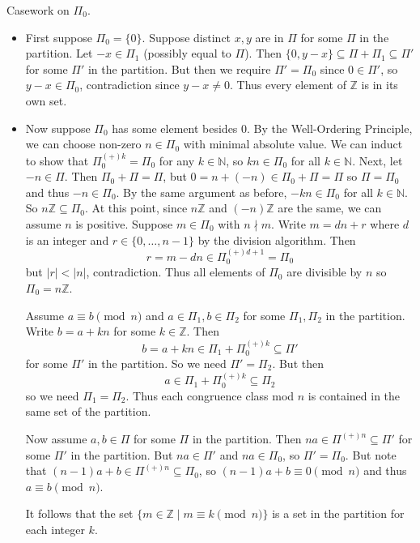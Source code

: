 Casework on $\Pi_0$.
\begin{itemize}
	\item First suppose $\Pi_0=\{0\}$. Suppose distinct $x,y$ are in $\Pi$ for some $\Pi$ in the partition. Let $-x\in\Pi_1$ (possibly equal to $\Pi$). Then $\{0,y-x\}\subseteq\Pi+\Pi_1\subseteq\Pi'$ for some $\Pi'$ in the partition. But then we require $\Pi'=\Pi_0$ since $0\in\Pi'$, so $y-x\in\Pi_0$, contradiction since $y-x\neq0$. Thus every element of $\mathbb{Z}$ is in its own set.
	\item Now suppose $\Pi_0$ has some element besides $0$. By the Well-Ordering Principle, we can choose non-zero $n\in\Pi_0$ with minimal absolute value. We can induct to show that $\Pi_0^{(+)k}=\Pi_0$ for any $k\in\mathbb{N}$, so $kn\in\Pi_0$ for all $k\in\mathbb{N}$. Next, let $-n\in\Pi$. Then $\Pi_0+\Pi=\Pi$, but $0=n+(-n)\in\Pi_0+\Pi=\Pi$ so $\Pi=\Pi_0$ and thus $-n\in\Pi_0$. By the same argument as before, $-kn\in\Pi_0$ for all $k\in\mathbb{N}$. So $n\mathbb{Z}\subseteq\Pi_0$. At this point, since $n\mathbb{Z}$ and $(-n)\mathbb{Z}$ are the same, we can assume $n$ is positive. Suppose $m\in\Pi_0$ with $n\nmid m$. Write $m=dn+r$ where $d$ is an integer and $r\in\{0,\ldots,n-1\}$ by the division algorithm. Then
	\[
		r=m-dn\in\Pi_0^{(+)d+1}=\Pi_0
	\]
	but $|r|<|n|$, contradiction. Thus all elements of $\Pi_0$ are divisible by $n$ so $\Pi_0=n\mathbb{Z}$.
	
	Assume $a\equiv b\pmod n$ and $a\in\Pi_1,b\in\Pi_2$ for some $\Pi_1,\Pi_2$ in the partition. Write $b=a+kn$ for some $k\in\mathbb{Z}$. Then
	\[
		b=a+kn\in\Pi_1+\Pi_0^{(+)k}\subseteq\Pi'
	\]
	for some $\Pi'$ in the partition. So we need $\Pi'=\Pi_2$. But then
	\[
		a\in\Pi_1+\Pi_0^{(+)k}\subseteq\Pi_2
	\]
	so we need $\Pi_1=\Pi_2$. Thus each congruence class mod $n$ is contained in the same set of the partition.
	
	Now assume $a,b\in\Pi$ for some $\Pi$ in the partition. Then $na\in\Pi^{(+)n}\subseteq\Pi'$ for some $\Pi'$ in the partition. But $na\in\Pi'$ and $na\in\Pi_0$, so $\Pi'=\Pi_0$. But note that $(n-1)a+b\in\Pi^{(+)n}\subseteq\Pi_0$, so $(n-1)a+b\equiv0\pmod n$ and thus $a\equiv b\pmod n$.
	
	It follows that the set $\{m\in\mathbb{Z}\mid m\equiv k\pmod n\}$ is a set in the partition for each integer $k$.
\end{itemize}